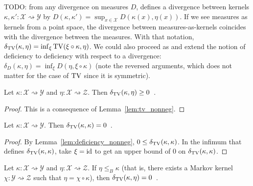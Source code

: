 TODO: from any divergence on measures $D$, \cite{perrone2023markov} defines a divergence between kernels $\kappa, \kappa' : \mathcal X \rightsquigarrow \mathcal Y$ by $D(\kappa, \kappa') = \sup_{x \in \mathcal X} D(\kappa(x), \eta(x))$.
If we see measures as kernels from a point space, the divergence between measures-as-kernels coincides with the divergence between the measures.
With that notation, $\delta_{\operatorname{TV}}(\kappa, \eta) = \inf_{\xi} \operatorname{TV}(\xi \circ \kappa, \eta)$.
We could also proceed as \cite{raginsky2011shannon} and extend the notion of deficiency to deficiency with respect to a divergence: $\delta_D(\kappa, \eta) = \inf_{\xi} D(\eta, \xi\circ\kappa)$ (note the reversed arguments, which does not matter for the case of $\operatorname{TV}$ since it is symmetric).

\begin{lemma}
  \label{lem:deficiency_nonneg}
  Let $\kappa: \mathcal X \rightsquigarrow \mathcal Y$ and $\eta : \mathcal X \rightsquigarrow \mathcal Z$. Then $\delta_{\operatorname{TV}}(\kappa, \eta) \ge 0$~.
\end{lemma}

\begin{proof}%
{}
This is a consequence of Lemma~\ref{lem:tv_nonneg}.
\end{proof}

\begin{lemma}
  \label{lem:deficiency_self}
  Let $\kappa: \mathcal X \rightsquigarrow \mathcal Y$. Then $\delta_{\operatorname{TV}}(\kappa, \kappa) = 0$~.
\end{lemma}

\begin{proof}%
{}
By Lemma~\ref{lem:deficiency_nonneg}, $0 \le \delta_{\operatorname{TV}}(\kappa, \kappa)$.
In the infimum that defines $\delta_{\operatorname{TV}}(\kappa, \kappa)$, take $\xi = \textup{id}$ to get an upper bound of 0 on $\delta_{\operatorname{TV}}(\kappa, \kappa)$.
\end{proof}

\begin{lemma}
  \label{lem:deficiency_comp}
  Let $\kappa: \mathcal X \rightsquigarrow \mathcal Y$ and $\eta : \mathcal X \rightsquigarrow \mathcal Z$.
  If $\eta \le_B \kappa$ (that is, there exists a Markov kernel $\chi : \mathcal Y \rightsquigarrow \mathcal Z$ such that $\eta = \chi \circ \kappa$), then $\delta_{\operatorname{TV}}(\kappa, \eta) = 0$~.
\end{lemma}

